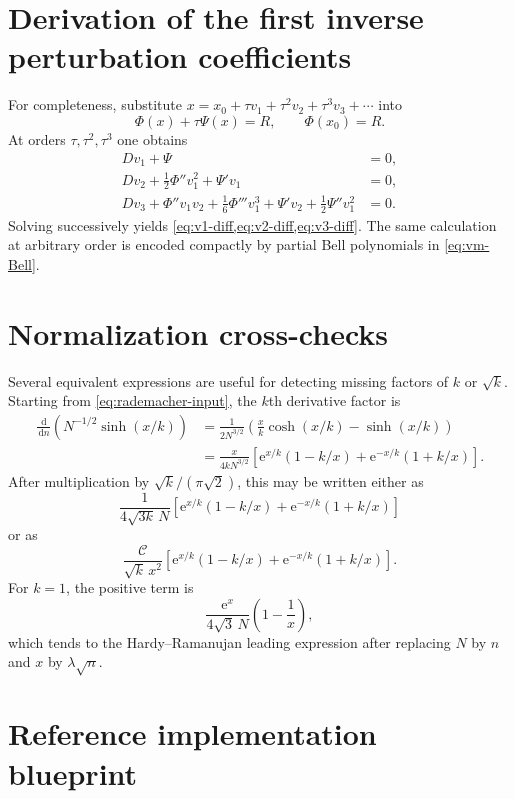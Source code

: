 \documentclass[11pt,a4paper]{article}
\numberwithin{equation}{section}
\theoremstyle{remark}
\newcommand{\e}{\mathrm e}
\newcommand{\dd}{\,\mathrm d}
\newcommand{\Ccal}{\mathcal C}
\begin{document}
\section{Derivation of the first inverse perturbation coefficients}\label{app:perturbation}

For completeness, substitute
$x=x_0+\tau v_1+\tau^2v_2+\tau^3v_3+\cdots$ into
\[
 \Phi(x)+\tau\Psi(x)=R,
 \qquad \Phi(x_0)=R.
\]
At orders $\tau,\tau^2,\tau^3$ one obtains
\begin{align*}
 Dv_1+\Psi&=0,\\
 Dv_2+\frac12\Phi''v_1^2+\Psi'v_1&=0,\\
 Dv_3+\Phi''v_1v_2+\frac16\Phi'''v_1^3
 +\Psi'v_2+\frac12\Psi''v_1^2&=0.
\end{align*}
Solving successively yields \cref{eq:v1-diff,eq:v2-diff,eq:v3-diff}.  The same calculation at arbitrary order is encoded compactly by partial Bell polynomials in \cref{eq:vm-Bell}.

\section{Normalization cross-checks}\label{app:normalization}

Several equivalent expressions are useful for detecting missing factors of $k$ or $\sqrt{k}$.
Starting from \cref{eq:rademacher-input}, the $k$th derivative factor is
\begin{align}
 \frac{\dd}{\dd n}\left(N^{-1/2}\sinh(x/k)\right)
 &=\frac1{2N^{3/2}}
 \left(\frac{x}{k}\cosh(x/k)-\sinh(x/k)\right)\\
 &=\frac{x}{4kN^{3/2}}
 \left[\e^{x/k}(1-k/x)+\e^{-x/k}(1+k/x)\right].
\end{align}
After multiplication by $\sqrt{k}/(\pi\sqrt2)$, this may be written either as
\begin{equation}
 \frac1{4\sqrt{3k}\,N}
 \left[\e^{x/k}(1-k/x)+\e^{-x/k}(1+k/x)\right]
\end{equation}
or as
\begin{equation}
 \frac{\Ccal}{\sqrt{k}\,x^2}
 \left[\e^{x/k}(1-k/x)+\e^{-x/k}(1+k/x)\right].
\end{equation}
For $k=1$, the positive term is
\begin{equation}
 \frac{\e^x}{4\sqrt3\,N}\left(1-\frac1x\right),
\end{equation}
which tends to the Hardy--Ramanujan leading expression after replacing $N$ by $n$ and $x$ by $\lambda\sqrt n$.

\section{Reference implementation blueprint}\label{app:implementation}
\end{document}
